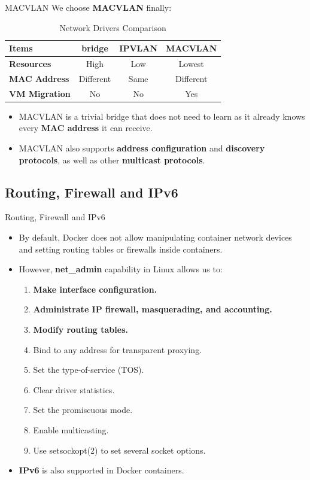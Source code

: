 \documentclass{beamer}
\begin{document}
\begin{frame}{MACVLAN}
We choose \textbf{MACVLAN} finally:
\begin{table}[t!]
  \begin{center}
    \caption{Network Drivers Comparison}
    \begin{tabular}{|l|c|c|c|}
    \hline
    \textbf{Items} & \textbf{bridge} & \textbf{IPVLAN} & \textbf{MACVLAN} \\
    \hline
    \textbf{Resources} & High & Low & Lowest \\
    \hline
    \textbf{MAC Address} & Different & Same & Different \\
    \hline
    \textbf{VM Migration} & No & No & Yes \\
    \hline
    \end{tabular}
    \label{tab:comparedrivers}
  \end{center}
\end{table}
\begin{itemize}
 \item MACVLAN is a trivial bridge that does not need to learn as it already knows every \textbf{MAC address} it can receive.
\item MACVLAN also supports \textbf{address configuration} and \textbf{discovery protocols}, as well as other \textbf{multicast protocols}.
\end{itemize}
\end{frame}

\subsection{Routing, Firewall and IPv6}
\begin{frame}{Routing, Firewall and IPv6}
\begin{itemize}
\item By default, Docker does not allow manipulating container network devices and setting routing tables or firewalls inside containers.
\item However, \textbf{net\_admin} capability in Linux allows us to:
\begin{enumerate}
\item \textbf{Make interface configuration.}
\item \textbf{Administrate IP firewall, masquerading, and accounting.}
\item \textbf{Modify routing tables.}
\item Bind to any address for transparent proxying.
\item Set the type-of-service (TOS).
\item Clear driver statistics.
\item Set the promiscuous mode.
\item Enable multicasting.
\item Use setsockopt(2) to set several socket options.
\end{enumerate}
\item \textbf{IPv6} is also supported in Docker containers.
\end{itemize}
\end{frame}
\end{document}
